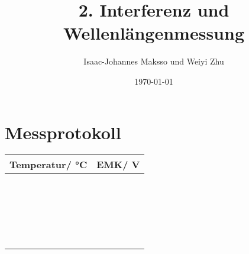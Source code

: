 \documentclass[a4paper,12pt,oneside,onecolum,final,openany]{report}
\title{2. Interferenz und Wellenlängenmessung}
\author{Isaac-Johannes Maksso und Weiyi Zhu}
\date{\today}
\begin{document}
\section*{Messprotokoll}
\begin{table}[h!]
\begin{tabular}{l|c}
Temperatur/ °C& EMK/ V \\
\hline
 &\\
\hline
 &\\
\hline
 &\\
\hline
 &\\
\hline
 &\\
 \hline
 &\\
\hline
 &\\
\hline
 &\\
\hline
 &\\
\hline
 &\\
 \hline
  &\\
\hline
 &\\
\hline
 &\\
\hline
 &\\
\hline
 &\\
 \hline
  &\\
\hline
 &\\
\hline
 &\\
\hline
 &\\
\hline
 &\\
\hline
& \\ 
 \end{tabular}
\end{table}
\FloatBarrier 
\noindent
\end{document}
